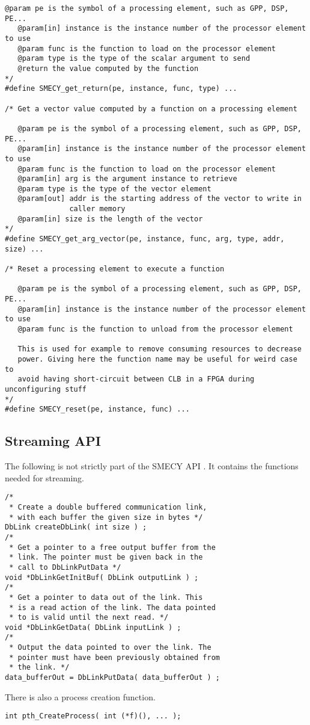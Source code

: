 \documentclass [A4]{article}
\begin{document}
\begin{lstlisting}[frame=none,numbers=none]
   @param pe is the symbol of a processing element, such as GPP, DSP, PE...
   @param[in] instance is the instance number of the processor element to use
   @param func is the function to load on the processor element
   @param type is the type of the scalar argument to send
   @return the value computed by the function
*/
#define SMECY_get_return(pe, instance, func, type) ...

/* Get a vector value computed by a function on a processing element

   @param pe is the symbol of a processing element, such as GPP, DSP, PE...
   @param[in] instance is the instance number of the processor element to use
   @param func is the function to load on the processor element
   @param[in] arg is the argument instance to retrieve
   @param type is the type of the vector element
   @param[out] addr is the starting address of the vector to write in
               caller memory
   @param[in] size is the length of the vector
*/
#define SMECY_get_arg_vector(pe, instance, func, arg, type, addr, size) ...

/* Reset a processing element to execute a function

   @param pe is the symbol of a processing element, such as GPP, DSP, PE...
   @param[in] instance is the instance number of the processor element to use
   @param func is the function to unload from the processor element

   This is used for example to remove consuming resources to decrease
   power. Giving here the function name may be useful for weird case to
   avoid having short-circuit between CLB in a FPGA during unconfiguring stuff
*/
#define SMECY_reset(pe, instance, func) ...
	\end{lstlisting}
	
	\subsection{Streaming API}
	The following is not strictly part of the SMECY API \cite{smec}. It contains the functions needed for streaming.
	\begin{lstlisting}[frame=none, numbers=none]
/*
 * Create a double buffered communication link,
 * with each buffer the given size in bytes */
DbLink createDbLink( int size ) ;
/*
 * Get a pointer to a free output buffer from the
 * link. The pointer must be given back in the
 * call to DbLinkPutData */
void *DbLinkGetInitBuf( DbLink outputLink ) ;
/*
 * Get a pointer to data out of the link. This
 * is a read action of the link. The data pointed
 * to is valid until the next read. */
void *DbLinkGetData( DbLink inputLink ) ;
/*
 * Output the data pointed to over the link. The
 * pointer must have been previously obtained from
 * the link. */
data_bufferOut = DbLinkPutData( data_bufferOut ) ;
	\end{lstlisting} 

	There is also a process creation function.
	\begin{lstlisting}[frame=none, numbers=none]
int pth_CreateProcess( int (*f)(), ... );
	\end{lstlisting}
	
	{}
	 

	
\end{document}
